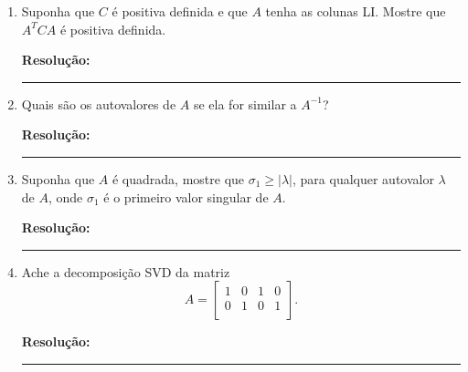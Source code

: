 \documentclass[leqno]{article}
\numberwithin{equation}{section}
\newenvironment{sol}
{
    \vspace{4mm}
    \noindent\textbf{Resolução:}
    \strut\newline
    \smallskip
    \hspace{-3.5mm}
}
{\noindent\rule{4cm}{.1mm}}
\begin{document}
\begin{enumerate}
\item Suponha que $C$ é positiva definida e que $A$ tenha as colunas LI. Mostre que $A^TCA$ é positiva definida.

\begin{sol} 
\end{sol} 


\item Quais são os autovalores de $A$ se ela for similar a $A^{-1}$?

\begin{sol} 
\end{sol} 


\item Suponha que $A$ é quadrada, mostre que $\sigma_1 \geq |\lambda|$, para qualquer autovalor $\lambda$ de $A$, onde $\sigma_1$ é o primeiro valor singular de $A$.

\begin{sol} 
\end{sol} 


\item Ache a decomposição SVD da matriz
$$A = \begin{bmatrix}
1 & 0 & 1 & 0\\
0 & 1 & 0 & 1 \\
\end{bmatrix}.$$

\begin{sol} 
\end{sol} 
\end{enumerate}
\end{document}
